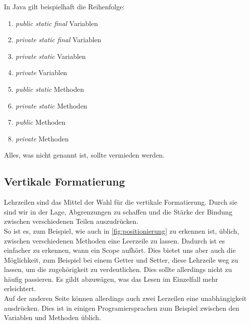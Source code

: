         In Java gilt beispielhaft die Reihenfolge:
        \begin{enumerate}
            \item \textit{public static final} Variablen
            \item \textit{private static final} Variablen
            \item \textit{private static} Variablen
            \item \textit{private} Variablen
            \item \textit{public static} Methoden
            \item \textit{private static} Methoden
            \item \textit{public} Methoden
            \item \textit{private} Methoden
        \end{enumerate}
        Alles, was nicht genannt ist, sollte vermieden werden.

    \subsection{Vertikale Formatierung}
        Lehrzeilen sind das Mittel der Wahl für die vertikale Formatierung.
        Durch sie sind wir in der Lage, Abgrenzungen zu schaffen und die Stärke der Bindung zwischen verschiedenen Teilen auszudrücken.\\
        So ist es, zum Beispiel, wie auch in \ref{fig:positionierung} zu erkennen ist, üblich, zwischen verschiedenen Methoden eine Leerzeile zu lassen.
        Dadurch ist es einfacher zu erkennen, wann ein Scope aufhört.
        Dies bietet uns aber auch die Möglichkeit, zum Beispiel bei einem Getter und Setter, diese Lehrzeile weg zu lassen, um die zugehörigkeit zu verdeutlichen.
        Dies sollte allerdings nicht zu häufig passieren.
        Es gildt abzuwägen, was das Lesen im Einzelfall mehr erleichtert.\\
        Auf der anderen Seite können allerdings auch zwei Lerzeilen eine unabhängigkeit ausdrücken.
        Dies ist in einigen Programiersprachen zum Beispiel zwischen den Variablen und Methoden üblich.
